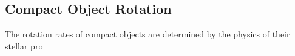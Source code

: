 {\color{orange}

\subsection{Compact Object Rotation}

The rotation rates of compact objects are determined by the physics of their stellar pro

}